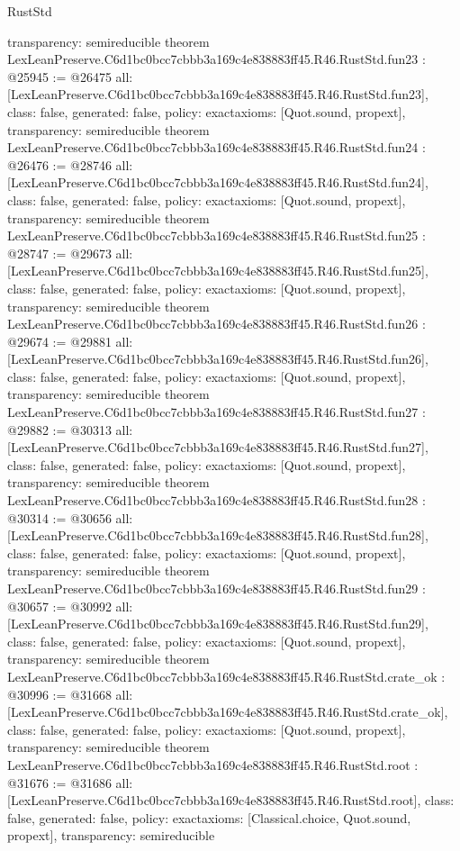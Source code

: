 \begin{lexlean}{RustStd}
\begin{coremodule}
{  transparency: semireducible
}
theorem LexLeanPreserve.C6d1bc0bcc7cbbb3a169c4e838883ff45.R46.RustStd.fun23 : @25945 := @26475 {
  all: [LexLeanPreserve.C6d1bc0bcc7cbbb3a169c4e838883ff45.R46.RustStd.fun23],
  class: false,
  generated: false,
  policy: exact{axioms: [Quot.sound, propext]},
  transparency: semireducible
}
theorem LexLeanPreserve.C6d1bc0bcc7cbbb3a169c4e838883ff45.R46.RustStd.fun24 : @26476 := @28746 {
  all: [LexLeanPreserve.C6d1bc0bcc7cbbb3a169c4e838883ff45.R46.RustStd.fun24],
  class: false,
  generated: false,
  policy: exact{axioms: [Quot.sound, propext]},
  transparency: semireducible
}
theorem LexLeanPreserve.C6d1bc0bcc7cbbb3a169c4e838883ff45.R46.RustStd.fun25 : @28747 := @29673 {
  all: [LexLeanPreserve.C6d1bc0bcc7cbbb3a169c4e838883ff45.R46.RustStd.fun25],
  class: false,
  generated: false,
  policy: exact{axioms: [Quot.sound, propext]},
  transparency: semireducible
}
theorem LexLeanPreserve.C6d1bc0bcc7cbbb3a169c4e838883ff45.R46.RustStd.fun26 : @29674 := @29881 {
  all: [LexLeanPreserve.C6d1bc0bcc7cbbb3a169c4e838883ff45.R46.RustStd.fun26],
  class: false,
  generated: false,
  policy: exact{axioms: [Quot.sound, propext]},
  transparency: semireducible
}
theorem LexLeanPreserve.C6d1bc0bcc7cbbb3a169c4e838883ff45.R46.RustStd.fun27 : @29882 := @30313 {
  all: [LexLeanPreserve.C6d1bc0bcc7cbbb3a169c4e838883ff45.R46.RustStd.fun27],
  class: false,
  generated: false,
  policy: exact{axioms: [Quot.sound, propext]},
  transparency: semireducible
}
theorem LexLeanPreserve.C6d1bc0bcc7cbbb3a169c4e838883ff45.R46.RustStd.fun28 : @30314 := @30656 {
  all: [LexLeanPreserve.C6d1bc0bcc7cbbb3a169c4e838883ff45.R46.RustStd.fun28],
  class: false,
  generated: false,
  policy: exact{axioms: [Quot.sound, propext]},
  transparency: semireducible
}
theorem LexLeanPreserve.C6d1bc0bcc7cbbb3a169c4e838883ff45.R46.RustStd.fun29 : @30657 := @30992 {
  all: [LexLeanPreserve.C6d1bc0bcc7cbbb3a169c4e838883ff45.R46.RustStd.fun29],
  class: false,
  generated: false,
  policy: exact{axioms: [Quot.sound, propext]},
  transparency: semireducible
}
theorem LexLeanPreserve.C6d1bc0bcc7cbbb3a169c4e838883ff45.R46.RustStd.crate_ok : @30996 := @31668 {
  all: [LexLeanPreserve.C6d1bc0bcc7cbbb3a169c4e838883ff45.R46.RustStd.crate_ok],
  class: false,
  generated: false,
  policy: exact{axioms: [Quot.sound, propext]},
  transparency: semireducible
}
theorem LexLeanPreserve.C6d1bc0bcc7cbbb3a169c4e838883ff45.R46.RustStd.root : @31676 := @31686 {
  all: [LexLeanPreserve.C6d1bc0bcc7cbbb3a169c4e838883ff45.R46.RustStd.root],
  class: false,
  generated: false,
  policy: exact{axioms: [Classical.choice, Quot.sound, propext]},
  transparency: semireducible
}


\end{coremodule}
\end{lexlean}
